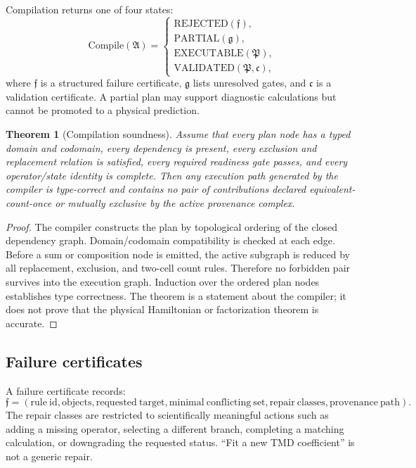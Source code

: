 \documentclass[11pt]{article}
\newtheorem{theorem}[definition]{Theorem}
\newcommand{\Aset}{\mathfrak A}
\newcommand{\Pplan}{\mathfrak P}
\begin{document}
Compilation returns one of four states:
\begin{equation}
 \mathrm{Compile}(\Aset)=
 \begin{cases}
 \mathrm{REJECTED}(\mathfrak f),\\
 \mathrm{PARTIAL}(\mathfrak g),\\
 \mathrm{EXECUTABLE}(\Pplan),\\
 \mathrm{VALIDATED}(\Pplan,\mathfrak c),
 \end{cases}
\label{eq:compile-states}
\end{equation}
where \(\mathfrak f\) is a structured failure certificate,
\(\mathfrak g\) lists unresolved gates, and \(\mathfrak c\) is a validation
certificate.  A partial plan may support diagnostic calculations but cannot be
promoted to a physical prediction.

\begin{theorem}[Compilation soundness]
Assume that every plan node has a typed domain and codomain, every dependency
is present, every exclusion and replacement relation is satisfied, every
required readiness gate passes, and every operator/state identity is complete.
Then any execution path generated by the compiler is type-correct and contains
no pair of contributions declared equivalent-count-once or mutually exclusive
by the active provenance complex.
\end{theorem}

\begin{proof}
The compiler constructs the plan by topological ordering of the closed
dependency graph.  Domain/codomain compatibility is checked at each edge.
Before a sum or composition node is emitted, the active subgraph is reduced by
all replacement, exclusion, and two-cell count rules.  Therefore no forbidden
pair survives into the execution graph.  Induction over the ordered plan nodes
establishes type correctness.  The theorem is a statement about the compiler;
it does not prove that the physical Hamiltonian or factorization theorem is
accurate.
\end{proof}

\subsection{Failure certificates}

A failure certificate records:
\begin{equation}
 \mathfrak f=
 \left(
 \mathrm{rule\ id},
 \mathrm{objects},
 \mathrm{requested\ target},
 \mathrm{minimal\ conflicting\ set},
 \mathrm{repair\ classes},
 \mathrm{provenance\ path}
 \right).
\label{eq:failure-certificate}
\end{equation}
The repair classes are restricted to scientifically meaningful actions such
as adding a missing operator, selecting a different branch, completing a
matching calculation, or downgrading the requested status.  ``Fit a new TMD
coefficient'' is not a generic repair.
\end{document}

